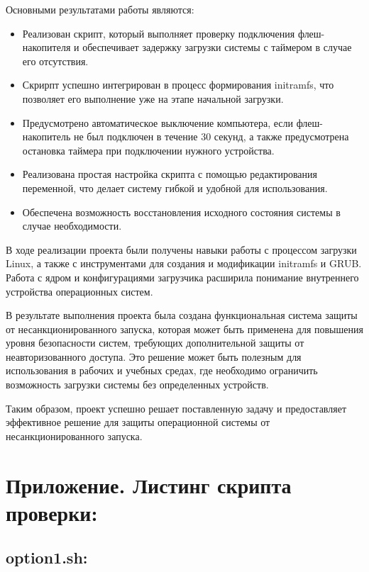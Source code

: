 \documentclass[12pt]{article}
\begin{document}
Основными результатами работы являются:
\begin{itemize}
    \item Реализован скрипт, который выполняет проверку подключения флеш-накопителя и обеспечивает задержку загрузки системы с таймером в случае его отсутствия.
    \item Скрирпт успешно интегрирован в процесс формирования initramfs, что позволяет его выполнение уже на этапе начальной загрузки.
    \item Предусмотрено автоматическое выключение компьютера, если флеш-накопитель не был подключен в течение 30 секунд, а также предусмотрена остановка таймера при подключении нужного устройства.
    \item Реализована простая настройка скрипта с помощью редактирования переменной, что делает систему гибкой и удобной для использования.
    \item Обеспечена возможность восстановления исходного состояния системы в случае необходимости.
\end{itemize}

В ходе реализации проекта были получены навыки работы с процессом загрузки Linux, а также с инструментами для создания и модификации initramfs и GRUB. Работа с ядром и конфигурациями загрузчика расширила понимание внутреннего устройства операционных систем.

В результате выполнения проекта была создана функциональная система защиты от несанкционированного запуска, которая может быть применена для повышения уровня безопасности систем, требующих дополнительной защиты от неавторизованного доступа. Это решение может быть полезным для использования в рабочих и учебных средах, где необходимо ограничить возможность загрузки системы без определенных устройств.

Таким образом, проект успешно решает поставленную задачу и предоставляет эффективное решение для защиты операционной системы от несанкционированного запуска.

\section*{Приложение. Листинг скрипта проверки:}

\subsection*{option1.sh:}
\end{document}
